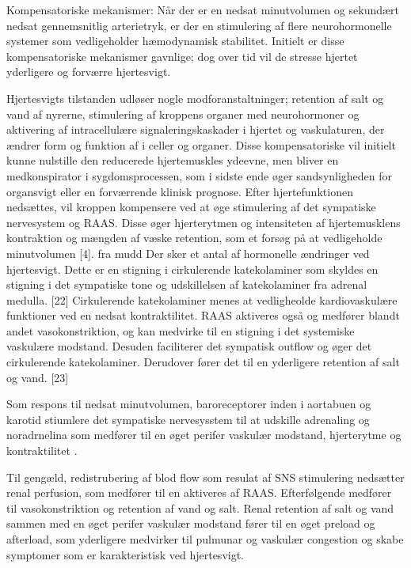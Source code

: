 Kompensatoriske mekanismer: Når der er en nedsat minutvolumen og sekundært nedsat gennemsnitlig arterietryk, er der en stimulering af flere neurohormonelle systemer som vedligeholder hæmodynamisk stabilitet. Initielt er disse kompensatoriske mekanismer gavnlige; dog over tid vil de stresse hjertet yderligere og forværre hjertesvigt. \citep{Mccance1998}

%
Hjertesvigts tilstanden udløser nogle modforanstaltninger; retention af salt og vand af nyrerne, stimulering af kroppens organer med neurohormoner og aktivering af intracellulære signaleringskaskader i hjertet og vaskulaturen, der ændrer form og funktion af i celler og organer. Disse kompensatoriske vil initielt kunne nulstille den reducerede hjertemuskles ydeevne, men bliver en medkonspirator i sygdomsprocessen, som i sidste ende øger sandsynligheden for organsvigt eller en forværrende klinisk prognose\citep{Mudd2008}. 
Efter hjertefunktionen nedsættes, vil kroppen kompensere ved at øge stimulering af det sympatiske nervesystem og RAAS. Disse øger hjerterytmen og intensiteten af hjertemusklens kontraktion og mængden af væske retention, som et forsøg på at vedligeholde minutvolumen [4]. fra mudd
Der sker et antal af hormonelle ændringer ved hjertesvigt. Dette er en stigning i cirkulerende katekolaminer som skyldes en stigning i det sympatiske tone og udskillelsen af katekolaminer fra adrenal medulla. [22] Cirkulerende katekolaminer menes at vedligheolde kardiovaskulære funktioner ved en nedsat kontraktilitet. RAAS aktiveres også og medfører blandt andet vasokonstriktion, og kan medvirke til en stigning i det systemiske vaskulære modstand. Desuden faciliterer det sympatisk outflow og øger det cirkulerende katekolaminer. Derudover fører det til en yderligere retention af salt og vand. [23]


Som respons til nedsat minutvolumen, baroreceptorer inden i aortabuen og karotid stiumlere det sympatiske nervesysstem til at udskille adrenaling og noradrnelina som medfører til en øget perifer vaskulær modstand, hjerterytme og kontraktilitet \citep{Fletcher2001}. 

Til gengæld, redistrubering af blod flow som resulat af SNS stimulering nedsætter renal perfusion, som medfører til en aktiveres af RAAS. Efterfølgende medfører til vasokonstriktion og retention af vand og salt. \citep{Mccance1998} Renal retention af salt og vand sammen med en øget perifer vaskulær modstand fører til en øget preload og afterload, som yderligere medvirker til pulmunar og vaskulær congestion og skabe symptomer som er karakteristisk ved hjertesvigt. \citep{Mccance1998}

